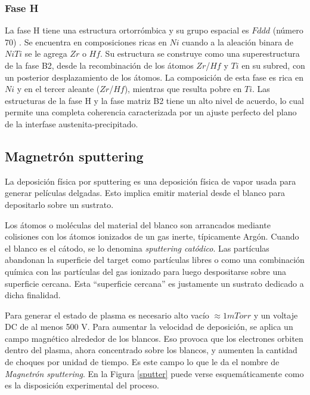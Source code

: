 \documentclass[12pt]{article}
\theoremstyle{definition}
\theoremstyle{remark}
\begin{document}
\subsubsection{Fase H}
La fase H tiene una estructura ortorrómbica y su grupo espacial es $Fddd$ (número 70) \cite{Yang2013} \cite{Santamarta2013}. Se encuentra en composiciones ricas en $Ni$ cuando a la aleación binara de $NiTi$ se le agrega $Zr$ o $Hf$. Su estructura se construye como una superestructura de la fase B2, desde la recombinación de los átomos $Zr$/$Hf$ y $Ti$ en su subred, con un posterior desplazamiento de los átomos\cite{Evirgen2018}. La composición de esta fase es rica en $Ni$ y en el tercer aleante ($Zr$/$Hf$), mientras que resulta pobre en $Ti$. Las estructuras de la fase H y la fase matriz B2 tiene un alto nivel de acuerdo, lo cual permite una completa coherencia caracterizada por un ajuste perfecto del plano de la interfase austenita-precipitado\cite{Evirgen2018}.


\subsection{Magnetrón sputtering}
La deposición física por sputtering es una deposición física de vapor usada para generar películas delgadas. Esto implica emitir material desde el blanco para depositarlo sobre un sustrato. 

 Los átomos o moléculas del material del blanco son arrancados mediante colisiones con los átomos ionizados de un gas inerte, típicamente Argón. Cuando el blanco es el cátodo, se lo denomina \textit{sputtering catódico}. Las partículas abandonan la superficie del target como partículas libres o como una combinación química con las partículas del gas ionizado para luego despositarse sobre una superficie cercana.  Esta ``superficie cercana'' es justamente un sustrato dedicado a dicha finalidad.
 
Para generar el estado de plasma es necesario alto vacío $\approx 1 mTorr$ y un voltaje DC de al menos 500 V. Para aumentar la velocidad de deposición, se aplica un campo magnético alrededor de los blancos. Eso provoca que los electrones orbiten dentro del plasma, ahora concentrado sobre los blancos, y aumenten la cantidad de choques por unidad de tiempo. Es este campo lo que le da el nombre de \textit{Magnetrón sputtering}\cite{Malvasio}\cite{ThinFilm}. En la Figura \ref{sputter} puede verse esquemáticamente como es la disposición experimental del proceso.
\end{document}
